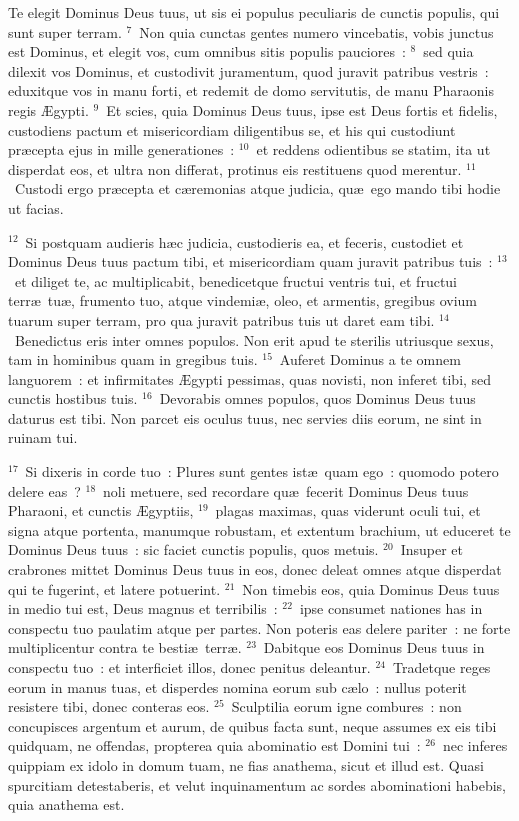  Te elegit Dominus Deus tuus, ut sis ei populus peculiaris de cunctis populis, qui sunt super terram.
${}^{7}$~Non quia cunctas gentes numero vincebatis, vobis junctus est Dominus, et elegit vos, cum omnibus sitis populis pauciores~:
${}^{8}$~sed quia dilexit vos Dominus, et custodivit juramentum, quod juravit patribus vestris~: eduxitque vos in manu forti, et redemit de domo servitutis, de manu Pharaonis regis \AE gypti.
${}^{9}$~Et scies, quia Dominus Deus tuus, ipse est Deus fortis et fidelis, custodiens pactum et misericordiam diligentibus se, et his qui custodiunt pr\ae cepta ejus in mille generationes~:
${}^{10}$~et reddens odientibus se statim, ita ut disperdat eos, et ultra non differat, protinus eis restituens quod merentur.
${}^{11}$~Custodi ergo pr\ae cepta et c\ae remonias atque judicia, qu\ae\ ego mando tibi hodie ut facias.


${}^{12}$~Si postquam audieris h\ae c judicia, custodieris ea, et feceris, custodiet et Dominus Deus tuus pactum tibi, et misericordiam quam juravit patribus tuis~:
${}^{13}$~et diliget te, ac multiplicabit, benedicetque fructui ventris tui, et fructui terr\ae\ tu\ae , frumento tuo, atque vindemi\ae , oleo, et armentis, gregibus ovium tuarum super terram, pro qua juravit patribus tuis ut daret eam tibi.
${}^{14}$~Benedictus eris inter omnes populos. Non erit apud te sterilis utriusque sexus, tam in hominibus quam in gregibus tuis.
${}^{15}$~Auferet Dominus a te omnem languorem~: et infirmitates \AE gypti pessimas, quas novisti, non inferet tibi, sed cunctis hostibus tuis.
${}^{16}$~Devorabis omnes populos, quos Dominus Deus tuus daturus est tibi. Non parcet eis oculus tuus, nec servies diis eorum, ne sint in ruinam tui.


${}^{17}$~Si dixeris in corde tuo~: Plures sunt gentes ist\ae\ quam ego~: quomodo potero delere eas~?
${}^{18}$~noli metuere, sed recordare qu\ae\ fecerit Dominus Deus tuus Pharaoni, et cunctis \AE gyptiis,
${}^{19}$~plagas maximas, quas viderunt oculi tui, et signa atque portenta, manumque robustam, et extentum brachium, ut educeret te Dominus Deus tuus~: sic faciet cunctis populis, quos metuis.
${}^{20}$~Insuper et crabrones mittet Dominus Deus tuus in eos, donec deleat omnes atque disperdat qui te fugerint, et latere potuerint.
${}^{21}$~Non timebis eos, quia Dominus Deus tuus in medio tui est, Deus magnus et terribilis~:
${}^{22}$~ipse consumet nationes has in conspectu tuo paulatim atque per partes. Non poteris eas delere pariter~: ne forte multiplicentur contra te besti\ae\ terr\ae .
${}^{23}$~Dabitque eos Dominus Deus tuus in conspectu tuo~: et interficiet illos, donec penitus deleantur.
${}^{24}$~Tradetque reges eorum in manus tuas, et disperdes nomina eorum sub c\ae lo~: nullus poterit resistere tibi, donec conteras eos.
${}^{25}$~Sculptilia eorum igne combures~: non concupisces argentum et aurum, de quibus facta sunt, neque assumes ex eis tibi quidquam, ne offendas, propterea quia abominatio est Domini tui~:
${}^{26}$~nec inferes quippiam ex idolo in domum tuam, ne fias anathema, sicut et illud est. Quasi spurcitiam detestaberis, et velut inquinamentum ac sordes abominationi habebis, quia anathema est.

